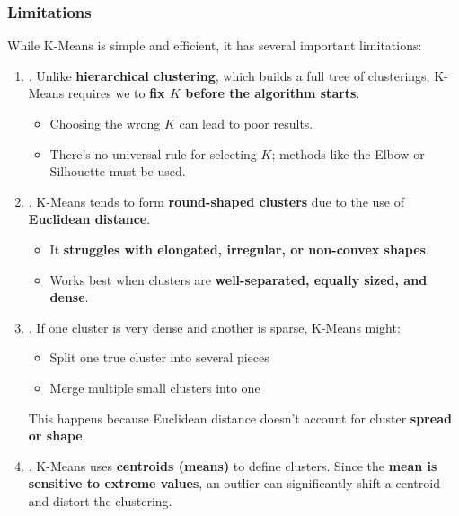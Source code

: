 \subsubsection{Limitations}

While K-Means is simple and efficient, it has several important limitations:
\begin{enumerate}
    \item {}. Unlike \textbf{hierarchical clustering}, which builds a full tree of clusterings, K-Means requires we to \textbf{fix $K$ before the algorithm starts}.
    \begin{itemize}[label=\textcolor{Red2}{}]
        \item Choosing the wrong $K$ can lead to poor results.
        \item There's no universal rule for selecting $K$; methods like the Elbow or Silhouette must be used.
    \end{itemize}


    \item {}. K-Means tends to form \textbf{round-shaped clusters} due to the use of \textbf{Euclidean distance}.
    \begin{itemize}[label=\textcolor{Red2}{}]
        \item It \textbf{struggles with elongated, irregular, or non-convex shapes}.
        \item Works best when clusters are \textbf{well-separated, equally sized, and dense}.
    \end{itemize}


    \item {}. If one cluster is very dense and another is sparse, K-Means might:
    \begin{itemize}[label=\textcolor{Red2}{}]
        \item Split one true cluster into several pieces
        \item Merge multiple small clusters into one
    \end{itemize}
    This happens because Euclidean distance doesn't account for cluster \textbf{spread or shape}.


    \item {}. K-Means uses \textbf{centroids (means)} to define clusters. Since the \textbf{mean is sensitive to extreme values}, an outlier can significantly shift a centroid and distort the clustering.


\end{enumerate}
